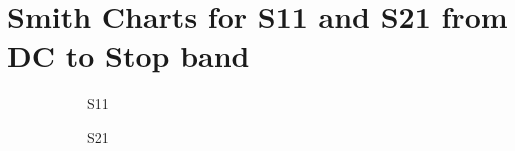 \documentclass[letterpaper,12pt]{article}
\begin{document}
\newpage
\section{Smith Charts for S11 and S21 from DC to Stop band\label{sec:smith}}
\begin{figure}[H]
    \begin{subfigure}[t]{.49\textwidth}
        \centering
        S11
    \end{subfigure}
    \hfill
    \begin{subfigure}[t]{.49\textwidth}
        \centering
        S21
    \end{subfigure}
    

\end{figure}
\end{document}
